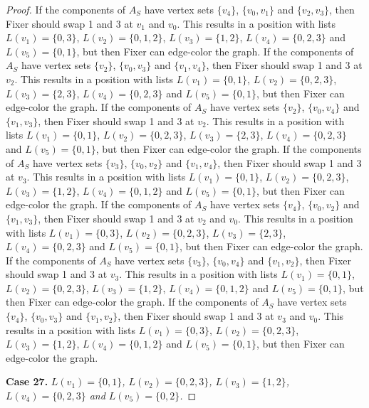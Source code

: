 \documentclass[12pt]{amsart}
\theoremstyle{plain}
\theoremstyle{definition}
\theoremstyle{remark}
\begin{document}
\begin{proof}
If the components of $A_S$ have vertex sets $\{v_4\}$, $\{v_0, v_1\}$ and $\{v_2, v_3\}$, then Fixer should swap 1 and 3 at $v_1$ and $v_0$. This results in a position with lists $L(v_1) = \{0, 3\}$, $L(v_2) = \{0, 1, 2\}$, $L(v_3) = \{1, 2\}$, $L(v_4) = \{0, 2, 3\}$ and $L(v_5) = \{0, 1\}$, but then Fixer can edge-color the graph.
If the components of $A_S$ have vertex sets $\{v_2\}$, $\{v_0, v_3\}$ and $\{v_1, v_4\}$, then Fixer should swap 1 and 3 at $v_2$. This results in a position with lists $L(v_1) = \{0, 1\}$, $L(v_2) = \{0, 2, 3\}$, $L(v_3) = \{2, 3\}$, $L(v_4) = \{0, 2, 3\}$ and $L(v_5) = \{0, 1\}$, but then Fixer can edge-color the graph.
If the components of $A_S$ have vertex sets $\{v_2\}$, $\{v_0, v_4\}$ and $\{v_1, v_3\}$, then Fixer should swap 1 and 3 at $v_2$. This results in a position with lists $L(v_1) = \{0, 1\}$, $L(v_2) = \{0, 2, 3\}$, $L(v_3) = \{2, 3\}$, $L(v_4) = \{0, 2, 3\}$ and $L(v_5) = \{0, 1\}$, but then Fixer can edge-color the graph.
If the components of $A_S$ have vertex sets $\{v_3\}$, $\{v_0, v_2\}$ and $\{v_1, v_4\}$, then Fixer should swap 1 and 3 at $v_3$. This results in a position with lists $L(v_1) = \{0, 1\}$, $L(v_2) = \{0, 2, 3\}$, $L(v_3) = \{1, 2\}$, $L(v_4) = \{0, 1, 2\}$ and $L(v_5) = \{0, 1\}$, but then Fixer can edge-color the graph.
If the components of $A_S$ have vertex sets $\{v_4\}$, $\{v_0, v_2\}$ and $\{v_1, v_3\}$, then Fixer should swap 1 and 3 at $v_2$ and $v_0$. This results in a position with lists $L(v_1) = \{0, 3\}$, $L(v_2) = \{0, 2, 3\}$, $L(v_3) = \{2, 3\}$, $L(v_4) = \{0, 2, 3\}$ and $L(v_5) = \{0, 1\}$, but then Fixer can edge-color the graph.
If the components of $A_S$ have vertex sets $\{v_3\}$, $\{v_0, v_4\}$ and $\{v_1, v_2\}$, then Fixer should swap 1 and 3 at $v_3$. This results in a position with lists $L(v_1) = \{0, 1\}$, $L(v_2) = \{0, 2, 3\}$, $L(v_3) = \{1, 2\}$, $L(v_4) = \{0, 1, 2\}$ and $L(v_5) = \{0, 1\}$, but then Fixer can edge-color the graph.
If the components of $A_S$ have vertex sets $\{v_4\}$, $\{v_0, v_3\}$ and $\{v_1, v_2\}$, then Fixer should swap 1 and 3 at $v_3$ and $v_0$. This results in a position with lists $L(v_1) = \{0, 3\}$, $L(v_2) = \{0, 2, 3\}$, $L(v_3) = \{1, 2\}$, $L(v_4) = \{0, 1, 2\}$ and $L(v_5) = \{0, 1\}$, but then Fixer can edge-color the graph.

\noindent\textbf{Case 27.  }\textit{$L(v_1) = \{0, 1\}$, $L(v_2) = \{0, 2, 3\}$, $L(v_3) = \{1, 2\}$, $L(v_4) = \{0, 2, 3\}$ and $L(v_5) = \{0, 2\}$.}


\end{proof}
\end{document}
